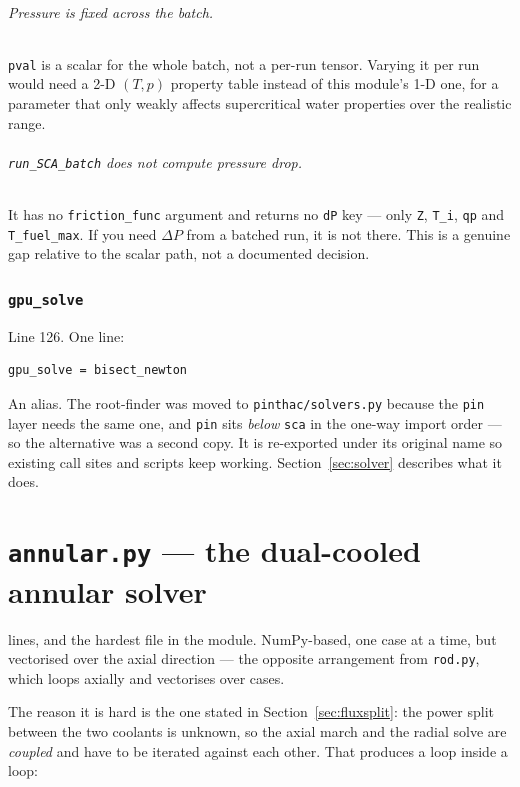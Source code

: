 \documentclass[11pt]{article}
\newcommand{\code}[1]{\texttt{#1}}
\begin{document}
\paragraph{Pressure is fixed across the batch.} \code{pval} is a scalar for the whole
batch, not a per-run tensor. Varying it per run would need a 2-D $(T,p)$ property table
instead of this module's 1-D one, for a parameter that only weakly affects supercritical
water properties over the realistic range.

\paragraph{\code{run\_SCA\_batch} does not compute pressure drop.} It has no
\code{friction\_func} argument and returns no \code{dP} key --- only \code{Z},
\code{T\_i}, \code{qp} and \code{T\_fuel\_max}. If you need $\Delta P$ from a batched run,
it is not there. This is a genuine gap relative to the scalar path, not a documented
decision.

\section{\code{gpu\_solve}}
Line 126. One line:
\begin{lstlisting}
gpu_solve = bisect_newton
\end{lstlisting}
An alias. The root-finder was moved to \code{pinthac/solvers.py} because the \code{pin}
layer needs the same one, and \code{pin} sits \emph{below} \code{sca} in the one-way
import order --- so the alternative was a second copy. It is re-exported under its
original name so existing call sites and scripts keep working. Section~\ref{sec:solver}
describes what it does.

\newpage
\part{\code{annular.py} --- the dual-cooled annular solver}

 lines, and the hardest file in the module. NumPy-based, one case at a time, but
vectorised over the axial direction --- the opposite arrangement from \code{rod.py},
which loops axially and vectorises over cases.

The reason it is hard is the one stated in Section~\ref{sec:fluxsplit}: the power split
between the two coolants is unknown, so the axial march and the radial solve are
\emph{coupled} and have to be iterated against each other. That produces a loop inside a
loop:
\end{document}
